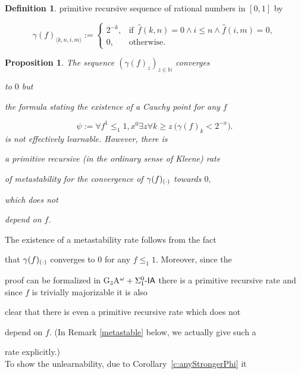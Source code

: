 \documentclass[1p]{elsarticle}
\newcommand{\usftext}[1]{\textsf{\upshape #1}}
\newcommand{\NN}{\ensuremath{\mathbb{N}}}
\newcommand{\IA}{\ensuremath{\usftext{IA}}} %
\newcommand{\SiLm}{\ensuremath{\Sigma^0_1\usftext{-}}}
\newcommand{\Tif}{\text{if}\ }
\newcommand{\Telse}{\text{otherwise}}
\theoremstyle{plain}
\newtheorem{prop}[thm]{Proposition}
\theoremstyle{definition}
\newtheorem{dfn}[thm]{Definition}
\theoremstyle{remark}
\renewenvironment{proof}[1][]{\noindent{\bf Proof{#1}. }}{\nopagebreak[4]{\hspace*{\fill}


  $\Box$              %

 }{\vspace{2ex}}}
\theoremstyle{definition}
\begin{document}
{\begin{dfn}
primitive recursive sequence of rational numbers in $[0,1]$ by

\[

\gamma(f)_{\langle k,n,i,m\rangle}:=\begin{cases}

2^{-k},&\Tif\ \widehat{f}(k,n)=0\wedge i\leq n\wedge \widehat{f}(i,m)=0,\\

0,&\Telse.\end{cases}

\]

\end{dfn}



\begin{prop}\label{p:gammaf} The sequence $(\gamma(f)_z)_{z\in\NN}$ converges 

to $0$ but

the formula stating the existence of a Cauchy point for any $f$ 

\[

\psi:=\forall f^1\leq_1 1,x^0\exists z \forall k\geq z\ \big( \gamma(f)_k<2^{-x} \big).

\] is not effectively learnable. However, there is

a primitive recursive (in the ordinary sense of Kleene) rate 

of metastability for the convergence of $\gamma(f)_{(\cdot)}$ towards $0,$ 

which does not 

depend on $f$.

\end{prop}

\begin{proof}

The existence of a metastability rate follows from the fact

that $\gamma(f)_{(\cdot)}$ converges to $0$ for any $f\leq_1 1$. Moreover, since the

proof can be formalized in G$_3$A$^\omega+\SiLm\IA$ there is a primitive recursive rate and since $f$ is trivially majorizable it is also

clear that there is even a primitive recursive rate which does not 

depend on $f$. (In Remark \ref{metastable} below, we actually give such a 

rate explicitly.)\\

To show the unlearnability, due to Corollary~\ref{c:anyStrongerPhi} it 


\end{proof}}
\end{document}
